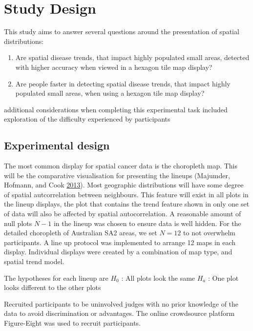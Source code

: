 \documentclass[conference,final,]{IEEEtran}
\begin{document}
\hypertarget{study-design}{%
\section{Study Design}\label{study-design}}

This study aims to answer several questions around the presentation of
spatial distributions:

\begin{enumerate}
\def\labelenumi{\arabic{enumi}.}
\item
  Are spatial disease trends, that impact highly populated small areas,
  detected with higher accuracy when viewed in a hexagon tile map
  display?
\item
  Are people faster in detecting spatial disease trends, that impact
  highly populated small areas, when using a hexagon tile map display?
\end{enumerate}

additional considerations when completing this experimental task
included exploration of the difficulty experienced by participants

\hypertarget{experimental-design}{%
\subsection{Experimental design}\label{experimental-design}}

The most common display for spatial cancer data is the choropleth map.
This will be the comparative visualisation for presenting the lineups
(Majumder, Hofmann, and Cook \protect\hyperlink{ref-VVSIALM}{2013}).
Most geographic distributions will have some degree of spatial
autcorrelation between neighbours. This feature will exist in all plots
in the lineup displays, the plot that contains the trend feature shown
in only one set of data will also be affected by spatial
autocorrelation. A reasonable amount of null plots \(N-1\) in the lineup
was chosen to ensure data is well hidden. For the detailed choropleth of
Australian SA2 areas, we set \(N = 12\) to not overwhelm participants. A
line up protocol was implemented to arrange 12 maps in each display.
Individual displays were created by a combination of map type, and
spatial trend model.

The hypotheses for each lineup are \(H_0\) : All plots look the same
\(H_a\) : One plot looks different to the other plots

Recruited participants to be uninvolved judges with no prior knowledge
of the data to avoid discrimination or advantages. The online
crowdsource platform Figure-Eight was used to recruit participants.
\end{document}
